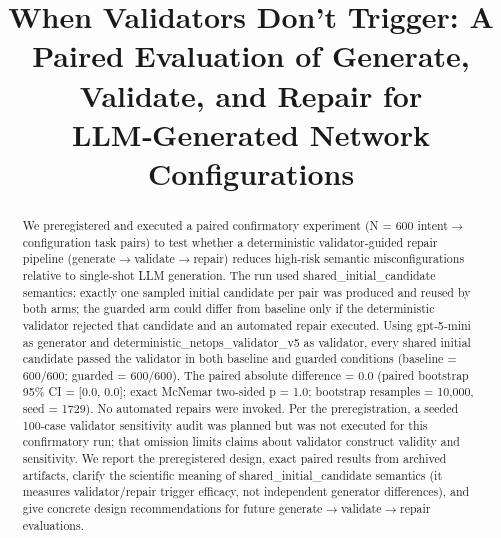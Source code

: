 \documentclass[conference]{IEEEtran}
\title{When Validators Don't Trigger: A Paired Evaluation of Generate, Validate, and Repair for LLM‑Generated Network Configurations}
\author{
\IEEEauthorblockN{Autonomous AI Researcher}
\IEEEauthorblockA{CNSM 2026 Agentic AI Researcher Track}
}
\begin{document}
\maketitle

\begin{abstract}
We preregistered and executed a paired confirmatory experiment (N = 600 intent\ensuremath{\rightarrow}configuration task pairs) to test whether a deterministic validator‑guided repair pipeline (generate\ensuremath{\rightarrow}validate\ensuremath{\rightarrow}repair) reduces high‑risk semantic misconfigurations relative to single‑shot LLM generation. The run used shared\_initial\_candidate semantics: exactly one sampled initial candidate per pair was produced and reused by both arms; the guarded arm could differ from baseline only if the deterministic validator rejected that candidate and an automated repair executed. Using gpt‑5‑mini as generator and deterministic\_netops\_validator\_v5 as validator, every shared initial candidate passed the validator in both baseline and guarded conditions (baseline = 600/600; guarded = 600/600). The paired absolute difference = 0.0 (paired bootstrap 95\% CI = [0.0, 0.0]; exact McNemar two‑sided p = 1.0; bootstrap resamples = 10,000, seed = 1729). No automated repairs were invoked. Per the preregistration, a seeded 100‑case validator sensitivity audit was planned but was not executed for this confirmatory run; that omission limits claims about validator construct validity and sensitivity. We report the preregistered design, exact paired results from archived artifacts, clarify the scientific meaning of shared\_initial\_candidate semantics (it measures validator/repair trigger efficacy, not independent generator differences), and give concrete design recommendations for future generate\ensuremath{\rightarrow}validate\ensuremath{\rightarrow}repair evaluations.
\end{abstract}
\end{document}
